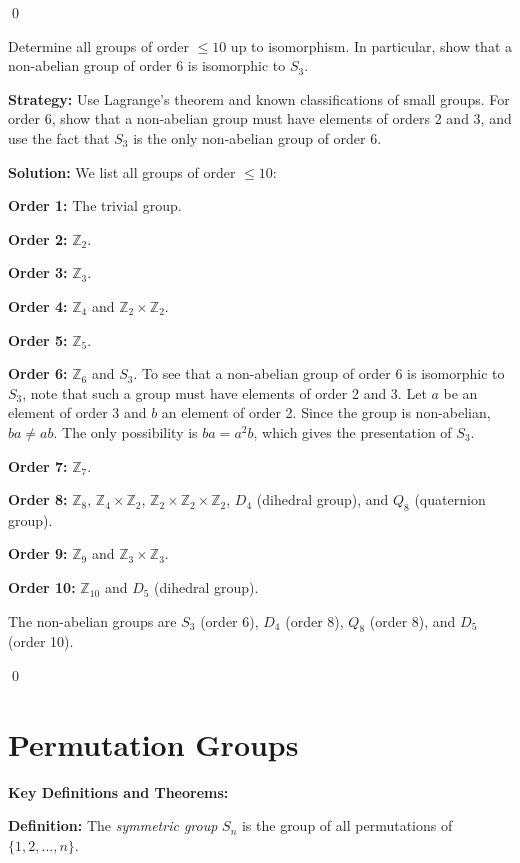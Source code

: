 \qed
\begin{problembox}
Determine all groups of order $\leq 10$ up to isomorphism. In particular, show that a non-abelian group of order 6 is isomorphic to $S_3$.
\end{problembox}

\noindent\textbf{Strategy:} Use Lagrange's theorem and known classifications of small groups. For order 6, show that a non-abelian group must have elements of orders 2 and 3, and use the fact that $S_3$ is the only non-abelian group of order 6.

\noindent\textbf{Solution:} We list all groups of order $\leq 10$:

\textbf{Order 1:} The trivial group.

\textbf{Order 2:} $\mathbb{Z}_2$.

\textbf{Order 3:} $\mathbb{Z}_3$.

\textbf{Order 4:} $\mathbb{Z}_4$ and $\mathbb{Z}_2 \times \mathbb{Z}_2$.

\textbf{Order 5:} $\mathbb{Z}_5$.

\textbf{Order 6:} $\mathbb{Z}_6$ and $S_3$. To see that a non-abelian group of order 6 is isomorphic to $S_3$, note that such a group must have elements of order 2 and 3. Let $a$ be an element of order 3 and $b$ an element of order 2. Since the group is non-abelian, $ba \neq ab$. The only possibility is $ba = a^2b$, which gives the presentation of $S_3$.

\textbf{Order 7:} $\mathbb{Z}_7$.

\textbf{Order 8:} $\mathbb{Z}_8$, $\mathbb{Z}_4 \times \mathbb{Z}_2$, $\mathbb{Z}_2 \times \mathbb{Z}_2 \times \mathbb{Z}_2$, $D_4$ (dihedral group), and $Q_8$ (quaternion group).

\textbf{Order 9:} $\mathbb{Z}_9$ and $\mathbb{Z}_3 \times \mathbb{Z}_3$.

\textbf{Order 10:} $\mathbb{Z}_{10}$ and $D_5$ (dihedral group).

The non-abelian groups are $S_3$ (order 6), $D_4$ (order 8), $Q_8$ (order 8), and $D_5$ (order 10).


\qed
\section{Permutation Groups}

\textbf{Key Definitions and Theorems:}

\textbf{Definition:} The \textit{symmetric group} $S_n$ is the group of all permutations of $\{1, 2, \ldots, n\}$.

